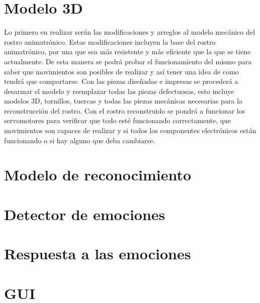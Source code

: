 \chapter{Modelo 3D}
Lo primero en realizar serán las modificaciones y arreglos al modelo mecánico del rostro animatrónico. Estas modificaciones incluyen la base del rostro animatrónico, por una que sea más resistente y más eficiente que la que se tiene actualmente. De esta manera se podrá probar el funcionamiento del mismo para saber que movimientos son posibles de realizar y así tener una idea de como tendrá que comportarse. Con las piezas diseñadas e impresas se procederá a desarmar el modelo y reemplazar todas las piezas defectuosas, esto incluye modelos 3D, tornillos, tuercas y todas las piezas mecánicas necesarias para la reconstrucción del rostro. Con el rostro reconstruido se pondrá a funcionar los servomotores para verificar que todo esté funcionando correctamente, que movimientos son capaces de realizar y si todos los componentes electrónicos están funcionando o si hay alguno que deba cambiarse.

\chapter{Modelo de reconocimiento}


\chapter{Detector de emociones}

\chapter{Respuesta a las emociones}

\chapter{GUI}